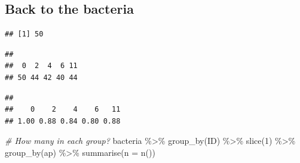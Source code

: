 \documentclass[
  openany]{book}
\newenvironment{Shaded}{\begin{snugshade}}{\end{snugshade}}
\newcommand{\AttributeTok}[1]{\textcolor[rgb]{0.77,0.63,0.00}{#1}}
\newcommand{\CommentTok}[1]{\textcolor[rgb]{0.56,0.35,0.01}{\textit{#1}}}
\newcommand{\DecValTok}[1]{\textcolor[rgb]{0.00,0.00,0.81}{#1}}
\newcommand{\FunctionTok}[1]{\textcolor[rgb]{0.00,0.00,0.00}{#1}}
\newcommand{\NormalTok}[1]{#1}
\newcommand{\SpecialCharTok}[1]{\textcolor[rgb]{0.00,0.00,0.00}{#1}}
\begin{document}
\hypertarget{back-to-the-bacteria}{%
\subsection{Back to the bacteria}\label{back-to-the-bacteria}}

\begin{Shaded}
\end{Shaded}

\begin{verbatim}
## [1] 50
\end{verbatim}

\begin{Shaded}
\end{Shaded}

\begin{verbatim}
## 
##  0  2  4  6 11 
## 50 44 42 40 44
\end{verbatim}

\begin{Shaded}
\end{Shaded}

\begin{verbatim}
## 
##    0    2    4    6   11 
## 1.00 0.88 0.84 0.80 0.88
\end{verbatim}

\begin{Shaded}
\begin{Highlighting}[]
\CommentTok{\# How many in each group?}
\NormalTok{bacteria }\SpecialCharTok{\%\textgreater{}\%} 
  \FunctionTok{group\_by}\NormalTok{(ID) }\SpecialCharTok{\%\textgreater{}\%} 
  \FunctionTok{slice}\NormalTok{(}\DecValTok{1}\NormalTok{) }\SpecialCharTok{\%\textgreater{}\%} 
  \FunctionTok{group\_by}\NormalTok{(ap) }\SpecialCharTok{\%\textgreater{}\%} 
  \FunctionTok{summarise}\NormalTok{(}\AttributeTok{n =} \FunctionTok{n}\NormalTok{())}
\end{Highlighting}
\end{Shaded}
\end{document}

